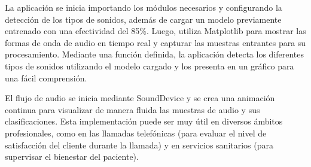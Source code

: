 La aplicación se inicia importando los módulos necesarios y configurando la detección de los tipos de sonidos, además de cargar un modelo previamente entrenado con una efectividad del 85\%. Luego, utiliza Matplotlib para mostrar las formas de onda de audio en tiempo real y capturar las muestras entrantes para su procesamiento. Mediante una función definida, la aplicación detecta los diferentes tipos de sonidos utilizando el modelo cargado y los presenta en un gráfico para una fácil comprensión.

El flujo de audio se inicia mediante SoundDevice y se crea una animación continua para visualizar de manera fluida las muestras de audio y sus clasificaciones. Esta implementación puede ser muy útil en diversos ámbitos profesionales, como en las llamadas telefónicas (para evaluar el nivel de satisfacción del cliente durante la llamada) y en servicios sanitarios (para supervisar el bienestar del paciente).